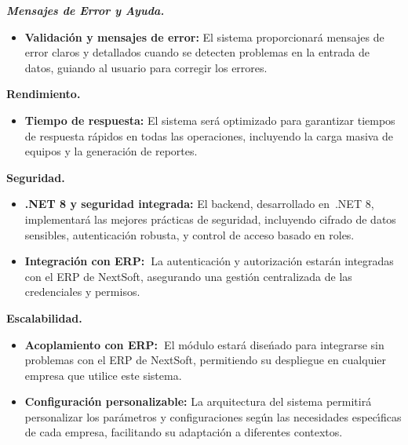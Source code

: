 \documentclass[stu, 12pt, letterpaper, donotrepeattitle, floatsintext, natbib]{apa7}
\begin{document}
\textit{\textbf{Mensajes de Error y Ayuda.}}
\begin{itemize}
    \item\textbf{Validaci\'on y mensajes de error: }El sistema proporcionar\'a mensajes de error claros y detallados cuando se detecten problemas en la entrada de datos, guiando al usuario para corregir los errores.
\end{itemize}

\textbf{Rendimiento.}
\begin{itemize}
    \item\textbf{Tiempo de respuesta: }El sistema ser\'a optimizado para garantizar tiempos de respuesta r\'apidos en todas las operaciones, incluyendo la carga masiva de equipos y la generaci\'on de reportes.
\end{itemize}

\textbf{Seguridad.}
\begin{itemize}
    \item\textbf{.NET 8 y seguridad integrada: }El backend, desarrollado en~.NET 8, implementar\'a las mejores pr\'acticas de seguridad, incluyendo cifrado de datos sensibles, autenticaci\'on robusta, y control de acceso basado en roles.
    \item\textbf{Integraci\'on con ERP:~}La autenticaci\'on y autorizaci\'on estar\'an integradas con el ERP de NextSoft, asegurando una gesti\'on centralizada de las credenciales y permisos.
\end{itemize}

\textbf{Escalabilidad.}
\begin{itemize}
    \item\textbf{Acoplamiento con ERP:~}El m\'odulo estar\'a dise\'{n}ado para integrarse sin problemas con el ERP de NextSoft, permitiendo su despliegue en cualquier empresa que utilice este sistema.
    \item\textbf{Configuraci\'on personalizable: }La arquitectura del sistema permitir\'a personalizar los par\'ametros y configuraciones seg\'un las necesidades espec\'{\i}ficas de cada empresa, facilitando su adaptaci\'on a diferentes contextos.
\end{itemize}
\end{document}
